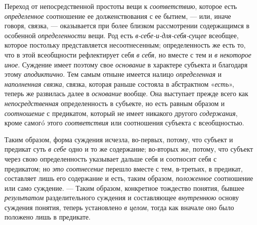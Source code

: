 \documentclass[twoside]{article}
\begin{document}
{{{Переход от непосредственной простоты вещи к
{\em соответствию},
которое есть
{\em определенное}
соотношение ее долженствования с ее бытием, —
или, иначе говоря, связка, — оказывается при
более близком рассмотрении содержащимся в особенной
{\em определенности}
вещи. Род есть
{\em в-себе-и-для-себя-сущее}
всеобщее, которое постольку представляется несоотнесенным;
определенность же есть то, что в этой всеобщности рефлектирует себя
{\em в себя}, но вместе с
тем и {\em в некоторое иное}.
Суждение имеет поэтому свое
{\em основание} в
характере субъекта и благодаря этому
{\em аподиктично}. Тем
самым отныне имеется налицо
{\em определенная} и
{\em наполненная связка},
связка, которая раньше состояла в абстрактном
«{\em есть}», теперь же
развилась далее в {\em основание}
вообще. Она выступает прежде всего как
{\em непосредственная}
определенность в субъекте, но есть равным образом и
{\em соотношение} с
предикатом, который не имеет никакого другого
{\em содержания}, кроме
самогó этого {\em соответствия}
или соотношения субъекта с всеобщностью.

Таким образом, форма суждения исчезла, во-первых, потому, что
субъект и предикат суть {\em в себе}
одно и то же содержание; во-вторых же, потому, что субъект
через свою определенность указывает дальше себя и соотносит себя с
предикатом; но {\em это соотнесение}
перешло вместе с тем, в-третьих, в предикат, составляет лишь
его содержание и есть, таким образом,
{\em положенное}
соотношение или само суждение. — Таким
образом, конкретное тождество понятия, бывшее
{\em результатом}
разделительного суждения и составляющее
{\em внутреннюю} основу
суждения понятия, теперь установлено
{\em в целом}, тогда как
вначале оно было положено лишь в предикате.

}}}
\end{document}
